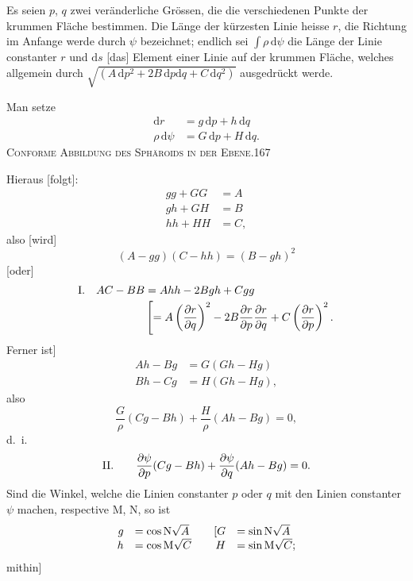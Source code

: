 Es seien $p$, $q$ zwei veränderliche Grössen, die die verschiedenen Punkte der krummen Fläche bestimmen. Die Länge der kürzesten Linie heisse $r$, die Richtung im Anfange werde durch $\psi$ bezeichnet; endlich sei $\int\rho\,\mathrm d\psi$ die Länge der Linie constanter $r$ und $\mathrm ds$ [das] Element einer Linie auf der krummen Fläche, welches allgemein durch $\sqrt{(A\,\mathrm dp^2+2B\,\mathrm dp\mathrm dq+C\,\mathrm dq^2)}$ ausgedrückt werde.

Man setze
\[
\begin{aligned}
\mathrm dr&=g\,\mathrm dp+h\,\mathrm dq\\
\rho\,\mathrm d\psi&=G\,\mathrm dp+H\,\mathrm dq.
\end{aligned}
\]
\clearpage
\noindent\mbox{}\hfill\textsc{Conforme Abbildung des Sphäroids in der Ebene.}\hfill167\par\medskip
Hieraus [folgt]:
\[
\begin{aligned}
gg+GG&=A\\
gh+GH&=B\\
hh+HH&=C,
\end{aligned}
\]
also [wird]
\[
(A-gg)(C-hh)=(B-gh)^2
\]
[oder]
\[
\begin{array}{r@{\quad}l}
\mathrm I.&\begin{aligned}[t]
AC-BB&=Ahh-2Bgh+Cgg\\
&\left[=A\left(\frac{\partial r}{\partial q}\right)^2-2B\frac{\partial r}{\partial p}\frac{\partial r}{\partial q}+C\left(\frac{\partial r}{\partial p}\right)^2.\right.
\end{aligned}
\end{array}
\]
Ferner ist]
\[
\begin{aligned}
Ah-Bg&=G(Gh-Hg)\\
Bh-Cg&=H(Gh-Hg),
\end{aligned}
\]
also
\[
\frac G\rho(Cg-Bh)+\frac H\rho(Ah-Bg)=0,
\]
d.~i.
\[
\begin{array}{r@{\qquad}l}
\mathrm{II}.&\displaystyle\frac{\partial\psi}{\partial p}(Cg-Bh)+\frac{\partial\psi}{\partial q}(Ah-Bg)=0.
\end{array}
\]
Sind die Winkel, welche die Linien constanter $p$ oder $q$ mit den Linien constanter $\psi$ machen, respective $\mathrm M$, $\mathrm N$, so ist
\[
\begin{array}{rl@{\qquad}rl}
g&=\cos\mathrm N\sqrt A&[G&=\sin\mathrm N\sqrt A\\
h&=\cos\mathrm M\sqrt C&H&=\sin\mathrm M\sqrt C;
\end{array}
\]
mithin]
